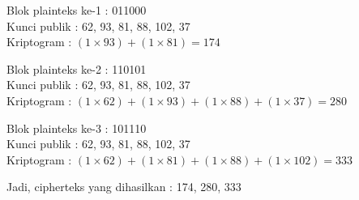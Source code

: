 \documentclass{article}
\begin{document}

Blok plainteks ke-1 : 011000 \\
Kunci publik : 62, 93, 81, 88, 102, 37 \\
Kriptogram : $(1 \times 93) + (1 \times 81) = 174$

\vspace{5mm}

Blok plainteks ke-2 : 110101 \\
Kunci publik : 62, 93, 81, 88, 102, 37 \\
Kriptogram : $(1 \times 62) + (1 \times 93) + (1 \times 88) + (1 \times 37) = 280$

\vspace{5mm}

Blok plainteks ke-3 : 101110 \\
Kunci publik : 62, 93, 81, 88, 102, 37 \\
Kriptogram : $(1 \times 62) + (1 \times 81) + (1 \times 88) + (1 \times 102) = 333$

\vspace{5mm}

Jadi, cipherteks yang dihasilkan : 174, 280, 333
\end{document}
